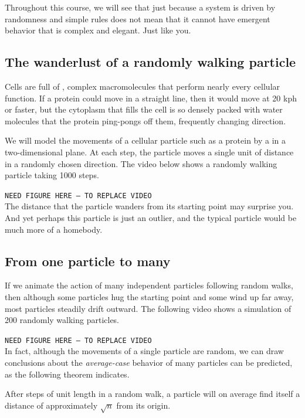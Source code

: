 Throughout this course, we will see that just because a system is driven by randomness and simple rules does not mean that it cannot have emergent behavior that is complex and elegant. Just like you.

\FloatBarrier
{}
\subsection{The wanderlust of a randomly walking particle}

Cells are full of , complex macromolecules that perform nearly every cellular function. If a protein could move in a straight line, then it would move at 20 kph or faster, but the cytoplasm that fills the cell is so densely packed with water molecules that the protein ping-pongs off them, frequently changing direction.

We will model the movements of a cellular particle such as a protein by a  in a two-dimensional plane. At each step, the particle moves a single unit of distance in a randomly chosen direction. The video below shows a randomly walking particle taking 1000 steps.

\texttt{NEED FIGURE HERE -- TO REPLACE VIDEO}\\

The distance that the particle wanders from its starting point may surprise you. And yet perhaps this particle is just an outlier, and the typical particle would be much more of a homebody.

\FloatBarrier
{}
\subsection{From one particle to many}

If we animate the action of many independent particles following random walks, then although some particles hug the starting point and some wind up far away, most particles steadily drift outward. The following video shows a simulation of 200 randomly walking particles.

\texttt{NEED FIGURE HERE -- TO REPLACE VIDEO}\\

In fact, although the movements of a single particle are random, we can draw conclusions about the \textit{average-case} behavior of many particles can be predicted, as the following theorem indicates.

 After  steps of unit length in a random walk, a particle will on average find itself a distance of approximately $\sqrt{n}$ from its origin.

